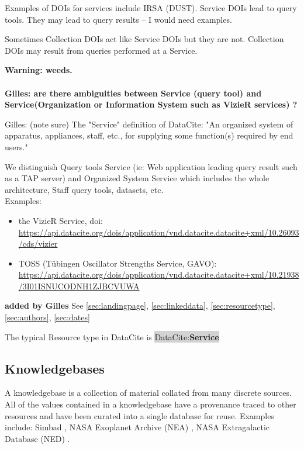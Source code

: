 \documentclass[11pt,a4paper]{ivoa}
\newcommand{\dataciteterm}[1]{\colorbox{lightgray}{DataCite:\textbf{#1}}}
\begin{document}
Examples of DOIs for services include IRSA (DUST).
Service DOIs lead to query tools.
They may lead to query results -- I would need examples.

Sometimes Collection DOIs act like Service DOIs but they are not.
Collection DOIs may result from queries performed at a Service.

\textbf{Warning: weeds.}

\paragraph{}
\textbf{\color{red} Gilles: are there ambiguities between Service (query tool) and Service(Organization or Information System such as VizieR services) ?\\}

{\color{red} Gilles: (note sure)
    The "Service" definition of DataCite: "An organized system of apparatus, appliances, staff, etc., for supplying some function(s) required by end users."

    We distinguish Query tools Service (ie: Web application leading query result such as a TAP server) and Organized System Service which includes the whole architecture, Staff query tools, datasets, etc. \\
    
    Examples:
    \begin{itemize}
    	\item the VizieR Service, doi:\\ \url{https://api.datacite.org/dois/application/vnd.datacite.datacite+xml/10.26093/cds/vizier}
    	\item TOSS (Tübingen Oscillator Strengths Service, GAVO):\\ \url{https://api.datacite.org/dois/application/vnd.datacite.datacite+xml/10.21938/3I01ISNUCODNH1ZJBCVUWA}
    \end{itemize} 

}

\textbf{\color{red} added by Gilles}
See \ref{sec:landingpage}, \ref{sec:linkeddata}, \ref{sec:resourcetype}, \ref{sec:authors}, \ref{sec:dates}


The typical Resource type in DataCite is \dataciteterm{Service}

\subsection{Knowledgebases}
\label{sec:intro:kdbs}

A knowledgebase is a collection of material collated from many discrete sources.
All of the values contained in a knowledgebase have a provenance traced to other resources and have been curated into a single database for reuse.
Examples include: Simbad \citep[as originally described in, ][]{2000A&AS..143....9W}, NASA Exoplanet Archive (NEA) \citep{NEA12-doi2bib} \citep[as originally described in,][]{2013PASP..125..989A}, NASA Extragalactic Database (NED) \citep{NED1-doi2bib} \citep[as originally described in,][]{1991ASSL..171...89H}. 
\end{document}

